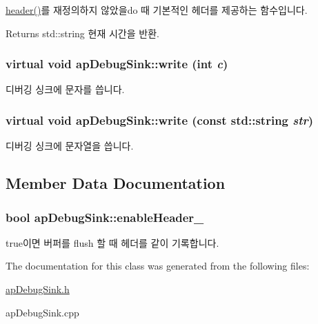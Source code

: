 \label{classapDebugSink_a0481b649618d6e167565ed0f7d36f27d}
\hyperlink{classapDebugSink_aae1dd83c95adcdc4d7ede36ae5c79287}{header()}를 재정의하지 않았을do 때 기본적인 헤더를 제공하는 함수입니다. \begin{DoxyReturn}{Returns}
std::string 현재 시간을 반환. 
\end{DoxyReturn}
\hypertarget{classapDebugSink_a3e367099f19e5edc7a125914653592d1}{
\subsubsection[{write}]{\setlength{\rightskip}{0pt plus 5cm}virtual void apDebugSink::write (int {\em c})}}
\label{classapDebugSink_a3e367099f19e5edc7a125914653592d1}
디버깅 싱크에 문자를 씁니다. \hypertarget{classapDebugSink_a6534c269975f6276f4754ba6316232ba}{
\subsubsection[{write}]{\setlength{\rightskip}{0pt plus 5cm}virtual void apDebugSink::write (const std::string {\em str})}}
\label{classapDebugSink_a6534c269975f6276f4754ba6316232ba}
디버깅 싱크에 문자열을 씁니다. 

\subsection{Member Data Documentation}
\hypertarget{classapDebugSink_a8629a797b6533d03aa7fdb81c124a64c}{
\subsubsection[{enableHeader\_\-}]{\setlength{\rightskip}{0pt plus 5cm}bool {\bf apDebugSink::enableHeader\_\-}}}
\label{classapDebugSink_a8629a797b6533d03aa7fdb81c124a64c}
true이면 버퍼를 flush 할 때 헤더를 같이 기록합니다. 

The documentation for this class was generated from the following files:\begin{DoxyCompactItemize}
\item 
\hyperlink{apDebugSink_8h}{apDebugSink.h}\item 
apDebugSink.cpp\end{DoxyCompactItemize}

